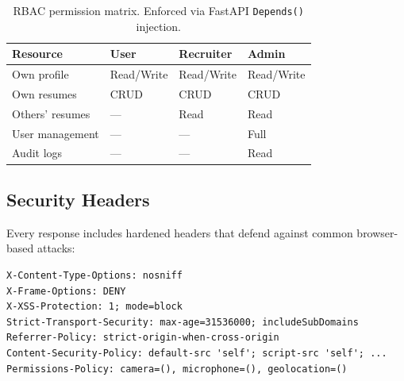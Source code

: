 \begin{table}[H]
\centering
\small
\begin{tabular}{p{3cm} p{2.5cm} p{2.5cm} p{2.5cm}}
    \toprule
    \textbf{Resource} & \textbf{User} & \textbf{Recruiter} & \textbf{Admin} \\
    \midrule
    Own profile      & Read/Write & Read/Write & Read/Write \\
    Own resumes      & CRUD       & CRUD       & CRUD \\
    Others' resumes  & —          & Read       & Read \\
    User management  & —          & —          & Full \\
    Audit logs       & —          & —          & Read \\
    \bottomrule
\end{tabular}
\caption{RBAC permission matrix. Enforced via FastAPI \texttt{Depends()} injection.}
\end{table}

\subsection{Security Headers}

Every response includes hardened headers that defend against common browser-based attacks:

\begin{lstlisting}
X-Content-Type-Options: nosniff
X-Frame-Options: DENY
X-XSS-Protection: 1; mode=block
Strict-Transport-Security: max-age=31536000; includeSubDomains
Referrer-Policy: strict-origin-when-cross-origin
Content-Security-Policy: default-src 'self'; script-src 'self'; ...
Permissions-Policy: camera=(), microphone=(), geolocation=()
\end{lstlisting}
